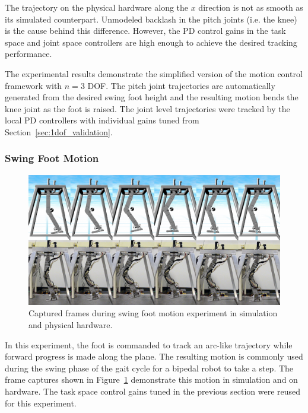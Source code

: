 The trajectory on the physical hardware along the $x$ direction is not as smooth as its simulated counterpart. Unmodeled backlash in the pitch joints (i.e. the knee) is the cause behind this difference. However, the PD control gains in the task space and joint space controllers are high enough to achieve the desired tracking performance. 

The experimental results demonstrate the simplified version of the motion control framework with $n = 3$ DOF. The pitch joint trajectories are automatically generated from the desired swing foot height and the resulting motion bends the knee joint as the foot is raised. The joint level trajectories were tracked by the local PD controllers with individual gains tuned from Section~\ref{sec:1dof_validation}. 


\subsubsection{Swing Foot Motion} %
\label{ssub:swing_foot_motion}

\begin{figure}[!b]
	\centering
    \includegraphics[scale=0.38]{fig/experiments/swingmotionframes.png} 
  	\caption{Captured frames during swing foot motion experiment in simulation and physical hardware.}
	\label{fig:swingmotionframes}
\end{figure}

In this experiment, the foot is commanded to track an arc-like trajectory while forward progress is made along the plane. The resulting motion is commonly used during the swing phase of the gait cycle for a bipedal robot to take a step. The frame captures shown in Figure~\ref{fig:swingmotionframes} demonstrate this motion in simulation and on hardware. The task space control gains tuned in the previous section were reused for this experiment. 

